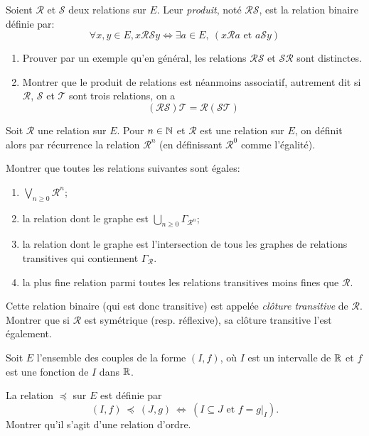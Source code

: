 \begin{exercice}
Soient $\mathcal R$ et $\mathcal S$ deux relations sur $E$. Leur \emph{produit}, noté $\mathcal R \mathcal S$, est la relation binaire définie par:
\[ \forall x,y\in E, x \mathcal R \mathcal S y 
\iff \exists a\in E, \: (x \mathcal R a \text{ et } a \mathcal S y)
\]
\begin{enumerate}
\item Prouver par un exemple qu'en général, les relations $\mathcal R \mathcal S$ et $\mathcal S \mathcal R$ sont distinctes.
\item Montrer que le produit de relations est néanmoins associatif, autrement dit si $\mathcal R$, $\mathcal S$ et $\mathcal T$ sont trois relations, on a 
\[ (\mathcal R \mathcal S) \mathcal T = \mathcal R (\mathcal S \mathcal T)\]
\end{enumerate}
\end{exercice}

\begin{exercice}
Soit $\mathcal R$ une relation sur $E$. Pour $n\in \mathbb{N}$ et $\mathcal R$ est une relation sur $E$, on définit alors par récurrence la relation $\mathcal R^n$ (en définissant $\mathcal R^0$ comme l'égalité).

Montrer que toutes les relations suivantes sont égales:
\begin{enumerate}
\item $\bigvee_{n\geq 0} \mathcal R^n$;
\item la relation dont le graphe est $\bigcup_{n\geq 0} \Gamma_{\mathcal R^{n}}$;
\item la relation dont le graphe est l'intersection de tous les graphes de relations transitives qui contiennent $\Gamma_{\mathcal R}$.
\item la plus fine relation  parmi toutes les relations transitives moins fines que $\mathcal R$.
\end{enumerate}

Cette relation binaire (qui est donc transitive) est appelée \emph{clôture transitive} de $\mathcal R$.
Montrer que si $\mathcal R$ est symétrique (resp. réflexive), sa clôture transitive l'est également.
\end{exercice}



\begin{exercice}
Soit $E$ l'ensemble des couples de la forme $(I,f)$, où $I$ est un intervalle de $\mathbb{R}$ et $f$ est une fonction de $I$ dans $\mathbb{R}$.

La relation $\preceq$ sur $E$ est définie par 
\[ (I,f)~\preceq~(J,g) ~\iff~ (I\subseteq J \text{ et } f=g|_I).\]
Montrer qu'il s'agit d'une relation d'ordre.
\end{exercice}

